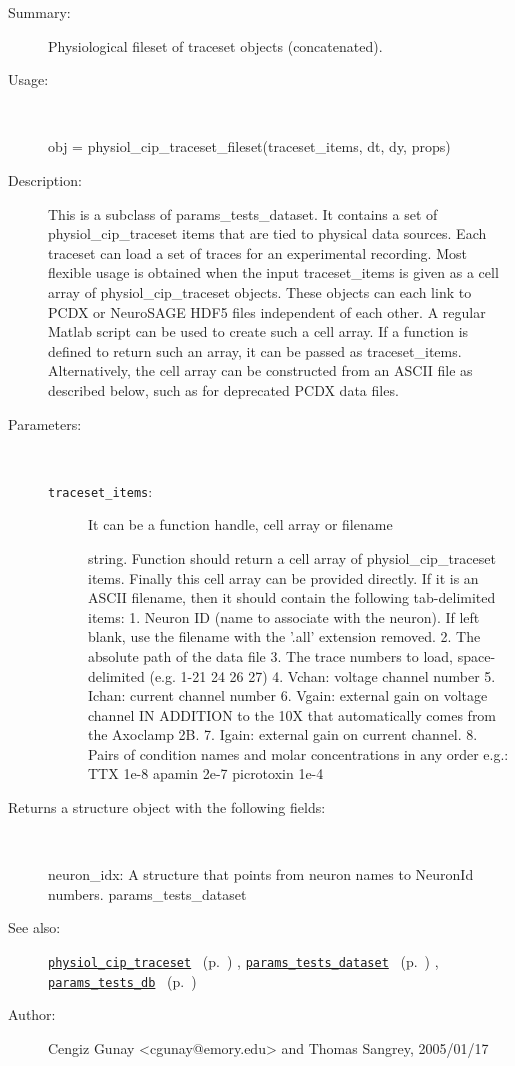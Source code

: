\begin{description}
\item[Summary:]Physiological fileset of traceset objects (concatenated).
%
\item[Usage:]~%
\begin{lyxcode}%
obj = physiol\_cip\_traceset\_fileset(traceset\_items, dt, dy, props)
%
\end{lyxcode}%
%
\item[Description:]%
This is a subclass of params\_tests\_dataset. It contains a set of
 physiol\_cip\_traceset items that are tied to physical data sources. Each
 traceset can load a set of traces for an experimental recording. Most
 flexible usage is obtained when the input traceset\_items is given as a
 cell array of physiol\_cip\_traceset objects. These objects can each link to
 PCDX or NeuroSAGE HDF5 files independent of each other. A regular Matlab
 script can be used to create such a cell array. If a function is defined
 to return such an array, it can be passed as
 traceset\_items. Alternatively, the cell array can be constructed from an
 ASCII file as described below, such as for deprecated PCDX data files.
\item[Parameters:]~
\begin{description}%
\item[\texttt{traceset\_items}:]
 It can be a function handle, cell array or filename

string. Function should return a cell array of physiol\_cip\_traceset
items. Finally this cell array can be provided directly.
If it is an ASCII filename, then it should contain the following tab-delimited items:
1. Neuron ID (name to associate with the neuron). If left blank, use
the filename with the '.all' extension removed.
2. The absolute path of the data file
3. The trace numbers to load, space-delimited (e.g. 1-21 24 26 27)
4. Vchan: voltage channel number
5. Ichan: current channel number
6. Vgain: external gain on voltage channel IN ADDITION to the 10X that
automatically comes from the Axoclamp 2B.
7. Igain: external gain on current channel.
8. Pairs of condition names and molar concentrations in any order
e.g.: TTX       1e-8    apamin  2e-7    picrotoxin      1e-4\end{description}%
%
\item[Returns a structure object with the following fields:]~

	neuron\_idx: A structure that points from neuron names to NeuronId numbers.
	params\_tests\_dataset
%
%
\item[See also:]%
\hyperlink{ref_physiol_cip_traceset}{\texttt{physiol\_cip\_traceset}}%
\ (p.~\pageref{ref_physiol_cip_traceset})%
%
, \hyperlink{ref_params_tests_dataset}{\texttt{params\_tests\_dataset}}%
\ (p.~\pageref{ref_params_tests_dataset})%
%
, \hyperlink{ref_params_tests_db}{\texttt{params\_tests\_db}}%
\ (p.~\pageref{ref_params_tests_db})%
%
%
\item[Author:]%
Cengiz Gunay <cgunay@emory.edu> and Thomas Sangrey, 2005/01/17%
\end{description}
\methodline%
